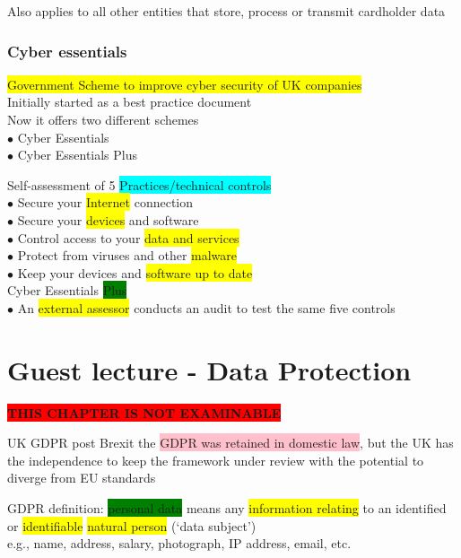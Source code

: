 \documentclass[tikz,border=10pt]{project_plan}
\newcommand{\bulletPoint}{\hspace{-3.1pt}$\bullet$ \hspace{5pt}}
\begin{document}
Also applies to all other entities that store, process or transmit cardholder data

\newpage

\subsection{Cyber essentials}
\colorbox{yellow}{Government Scheme to improve cyber security of UK companies}\\
Initially started as a best practice document\\
Now it offers two different schemes\\
\bulletPoint Cyber Essentials\\
\bulletPoint Cyber Essentials Plus

Self-assessment of 5 \colorbox{cyan}{Practices/technical controls}\\
\bulletPoint Secure your \colorbox{yellow}{Internet} connection\\
\bulletPoint Secure your \colorbox{yellow}{devices} and software\\
\bulletPoint Control access to your \colorbox{yellow}{data and services}\\
\bulletPoint Protect from viruses and other \colorbox{yellow}{malware}\\
\bulletPoint Keep your devices and \colorbox{yellow}{software up to date}\\
Cyber Essentials \colorbox{green}{Plus}\\
\bulletPoint An \colorbox{yellow}{external assessor} conducts an audit to test the same five controls

\chapter{Guest lecture - Data Protection}

\begin{center}
  \begin{Large}
    \textbf{
      \color{white}
      \colorbox{red}{THIS CHAPTER IS NOT EXAMINABLE}}
  \end{Large}
\end{center}

UK GDPR post Brexit the \colorbox{pink}{GDPR was retained in domestic law}, but the UK has the
independence to keep the framework under review  with the potential to diverge
from EU standards

GDPR definition: \colorbox{green}{personal data} means any \colorbox{yellow}{information relating} to an
identified or \colorbox{yellow}{identifiable} \colorbox{yellow}{natural person} (‘data subject’)\\
e.g., name, address, salary, photograph, IP address, email, etc.
\end{document}
